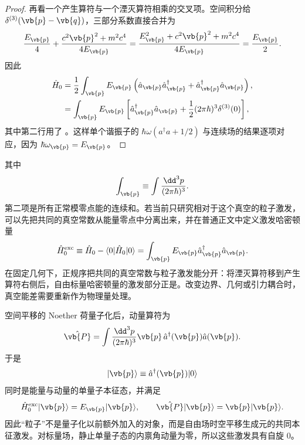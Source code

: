 \begin{proof}
再看一个产生算符与一个湮灭算符相乘的交叉项。空间积分给 $\delta^{(3)}(\vb{p}-\vb{q})$，三部分系数直接合并为
\begin{equation*}
 \frac{E_{\vb{p}}}4+\frac{c^2\vb{p}^2+m^2c^4}{4E_{\vb{p}}}
 =\frac{E_{\vb{p}}^2+c^2\vb{p}^2+m^2c^4}{4E_{\vb{p}}}
 =\frac{E_{\vb{p}}}2.
\end{equation*}
因此
\begin{align*}
 \hat H_0
 &=\frac12\int_{\vb{p}}E_{\vb{p}}
 \left(
 \hat a_{\vb{p}}\hat a_{\vb{p}}^\dagger
 +\hat a_{\vb{p}}^\dagger\hat a_{\vb{p}}
 \right),\\
 &=\int_{\vb{p}}E_{\vb{p}}
 \left[
 \hat a_{\vb{p}}^\dagger\hat a_{\vb{p}}
 +\frac12(2\pi\hbar)^3\delta^{(3)}(0)
 \right],
 \end{align*}
其中第二行用了 。这样单个谐振子的 $\hbar\omega(a^\dagger a+1/2)$ 与连续场的结果逐项对应，因为 $\hbar\omega_{\vb{p}}=E_{\vb{p}}$。
\end{proof}
其中
\begin{equation*}
 \int_{\vb{p}}\equiv\int\frac{\dd^3 p}{(2\pi\hbar)^3}.
\end{equation*}
第二项是所有正常模零点能的连续和。若当前只研究相对于这个真空的粒子激发，可以先把共同的真空常数从能量零点中分离出来，并在普通正文中定义激发哈密顿量
\begin{equation}
 {
 \hat H_0^{\rm exc}
 \equiv \hat H_0-\langle0|\hat H_0|0\rangle
 =\int_{\vb{p}}E_{\vb{p}}
 \hat a_{\vb{p}}^\dagger\hat a_{\vb{p}}.}
 \label{eq:scalar-H-excitation-dp76}
\end{equation}
在固定几何下，正规序把共同的真空常数与粒子激发能分开：将湮灭算符移到产生算符右侧后，自由标量哈密顿量的激发部分正是。改变边界、几何或引力耦合时，真空能差需要重新作为物理量处理。

空间平移的 Noether 荷量子化后，动量算符为
\begin{equation}
 \hat{\vb{P}}
 =\int\frac{\dd^3 p}{(2\pi\hbar)^3}
 \vb{p}\,\hat a^\dagger(\vb{p})\hat a(\vb{p}).
 \label{eq:scalar-P-r3}
\end{equation}
于是
\begin{equation*}
 |\vb{p}\rangle\equiv\hat a^\dagger(\vb{p})|0\rangle
\end{equation*}
同时是能量与动量的单量子本征态，并满足
\begin{equation*}
 \hat H_0^{\rm exc}|\vb{p}\rangle=E_{\vb{p}}|\vb{p}\rangle,
 \qquad
 \hat{\vb{P}}|\vb{p}\rangle=\vb{p}|\vb{p}\rangle.
\end{equation*}
因此“粒子”不是量子化以前额外加入的对象，而是自由场时空平移生成元的共同本征激发。对标量场，静止单量子态的内禀角动量为零，所以这些激发具有自旋 $0$。

